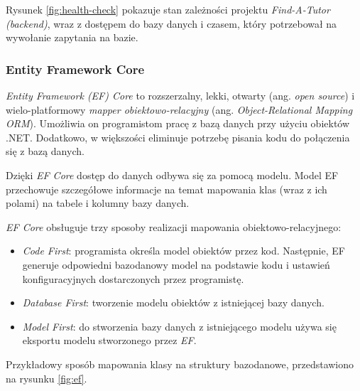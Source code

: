 \documentclass[12pt]{article}
\numberwithin{figure}{section}
\begin{document}
\begin{sloppypar}
Rysunek \ref{fig:health-check} pokazuje stan zależności projektu \textit{Find-A-Tutor (backend)}, wraz z dostępem do bazy danych i czasem, który potrzebował na wywołanie zapytania na bazie.

\label{EF}
\subsubsection{Entity Framework Core}
\textit{Entity Framework (EF) Core} to rozszerzalny, lekki, otwarty (ang. \textit{open source}) i wielo-platformowy \textit{mapper obiektowo-relacyjny} (ang. \textit{Object-Relational Mapping ORM}). Umożliwia on programistom pracę z bazą danych przy użyciu obiektów .NET. Dodatkowo, w większości eliminuje potrzebę pisania kodu do połączenia się z bazą danych. 
    
Dzięki \textit{EF Core} dostęp do danych odbywa się za pomocą modelu. Model EF przechowuje szczegółowe informacje na temat mapowania klas (wraz z ich polami) na tabele i kolumny bazy danych.
    
\textit{EF Core} obsługuje trzy sposoby realizacji mapowania obiektowo-relacyjnego:
    
\begin{itemize}
    \item \textit{Code First}: programista określa model obiektów przez kod. Następnie, EF generuje odpowiedni bazodanowy model na podstawie kodu i ustawień konfiguracyjnych dostarczonych przez programistę.
    \item \textit{Database First}: tworzenie modelu obiektów z istniejącej bazy danych.
    \item \textit{Model First}: do stworzenia bazy danych z istniejącego modelu używa się eksportu modelu stworzonego przez \textit{EF}.
\end{itemize}
    
Przykładowy sposób mapowania klasy na struktury bazodanowe, przedstawiono na rysunku \ref{fig:ef}.
    

\end{sloppypar}
\end{document}
